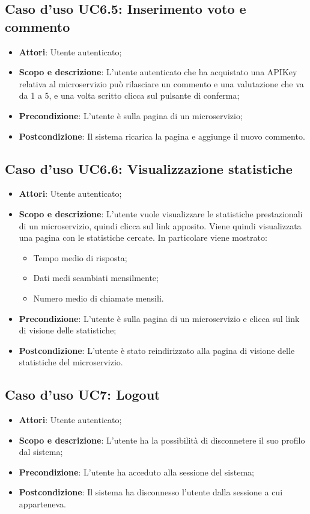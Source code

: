 \documentclass[12pt,a4paper,titlepage]{article}
\begin{document}
	\subsection{Caso d'uso UC6.5: Inserimento voto e commento}
	\label{UC6.5}
	\begin{itemize}
		\item \textbf{Attori}: Utente autenticato;
		\item \textbf{Scopo e descrizione}: L'utente autenticato che ha acquistato una APIKey relativa al microservizio può rilasciare un commento e una valutazione che va da 1 a 5, e una volta scritto clicca sul pulsante di conferma;
		\item \textbf{Precondizione}: L'utente è sulla pagina di un microservizio;
		\item \textbf{Postcondizione}: Il sistema ricarica la pagina e aggiunge il nuovo commento.
	\end{itemize}

	\subsection{Caso d'uso UC6.6: Visualizzazione statistiche }
	\label{UC6.6}
	\begin{itemize}
		\item \textbf{Attori}: Utente autenticato;
		\item \textbf{Scopo e descrizione}: L'utente vuole visualizzare le statistiche prestazionali di un microservizio, quindi clicca sul link apposito. Viene quindi visualizzata una pagina con le statistiche cercate. In particolare viene mostrato:
		\begin{itemize}
			\item Tempo medio di risposta;
			\item Dati medi scambiati mensilmente;
			\item Numero medio di chiamate mensili.
		\end{itemize}
		\item \textbf{Precondizione}: L'utente è sulla pagina di un microservizio e clicca sul link di visione delle statistiche;
		\item \textbf{Postcondizione}: L'utente è stato reindirizzato alla pagina di visione delle statistiche del microservizio.
	\end{itemize}


	\subsection{Caso d'uso UC7: Logout}
	\label{UC7}
	\begin{itemize}
		\item \textbf{Attori}: Utente autenticato;
		\item \textbf{Scopo e descrizione}: L'utente ha la possibilità di disconnetere il suo profilo dal sistema;
		\item \textbf{Precondizione}: L'utente ha acceduto alla sessione del sistema;
		\item \textbf{Postcondizione}: Il sistema ha disconnesso l'utente dalla sessione a cui apparteneva.
	\end{itemize}
\end{document}
